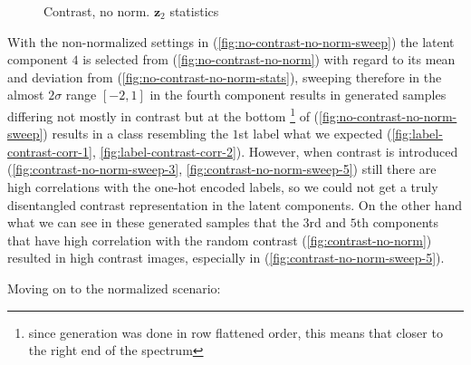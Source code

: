 \documentclass[12pt, english]{article}
\begin{document}
\begin{figure}[H]
\begin{minipage}{0.5\linewidth}
    \caption{Contrast, no norm. \newline $\bm{z}_{2}$ statistics} 
    \label{fig:contrast-no-norm-stats}
  \end{minipage}
\end{figure}

\vspace{4mm}

\par With the non-normalized settings in (\ref{fig:no-contrast-no-norm-sweep}) the latent component $4$ is selected from (\ref{fig:no-contrast-no-norm}) with regard to its mean and deviation from (\ref{fig:no-contrast-no-norm-stats}), sweeping therefore in the almost $2\sigma$ range $[-2, 1]$ in the fourth component results in generated samples differing not mostly in contrast but at the bottom \footnote{since generation was done in row flattened order, this means that closer to the right end of the spectrum} of (\ref{fig:no-contrast-no-norm-sweep}) results in a class resembling the $1$st label what we expected (\ref{fig:label-contrast-corr-1}, \ref{fig:label-contrast-corr-2}). However, when contrast is introduced (\ref{fig:contrast-no-norm-sweep-3}, \ref{fig:contrast-no-norm-sweep-5}) still there are high correlations with the one-hot encoded labels, so we could not get a truly disentangled contrast representation in the latent components. On the other hand what we can see in these generated samples that the $3$rd and $5$th components that have high correlation with the random contrast (\ref{fig:contrast-no-norm}) resulted in high contrast images, especially in (\ref{fig:contrast-no-norm-sweep-5}).

\vspace{4mm}

\par Moving on to the normalized scenario:

\vspace{4mm}
\end{document}
